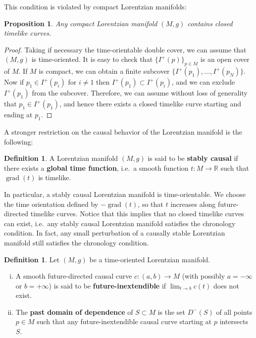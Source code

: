 \documentclass[12pt]{amsart}
\newcommand{\bbR}{\mathbb{R}}      %
\newcommand{\grad}{\operatorname{grad}}
\newtheorem{Prop}[Thm]{Proposition}
\theoremstyle{definition}
\newtheorem{Def}[Thm]{Definition}
\theoremstyle{remark}
\begin{document}
This condition is violated by compact Lorentzian manifolds:

\begin{Prop}
Any compact Lorentzian manifold $(M,g)$ contains closed timelike curves.
\end{Prop}

\begin{proof}
Taking if necessary the time-orientable double cover, we can assume that $(M,g)$ is time-oriented. It is easy to check that $\{ I^+(p) \}_{p \in M}$ is an open cover of $M$. If $M$ is compact, we can obtain a finite subcover $\{ I^+(p_1), \ldots, I^+(p_N) \}$. Now if $p_1 \in I^+(p_i)$ for $i \neq 1$ then $I^+(p_1) \subset I^+(p_i)$, and we can exclude $I^+(p_1)$ from the subcover. Therefore, we can assume without loss of generality that $p_1 \in I^+(p_1)$, and hence there exists a closed timelike curve starting and ending at $p_1$.
\end{proof}

A stronger restriction on the causal behavior of the Lorentzian manifold is the following:

\begin{Def}
A Lorentzian manifold $(M,g)$ is said to be {\bf stably causal} if there exists a {\bf global time function}, i.e.~a smooth function $t:M \to \bbR$ such that $\grad(t)$ is timelike.
\end{Def}

In particular, a stably causal Lorentzian manifold is time-orientable. We choose the time orientation defined by $-\grad(t)$, so that $t$ increases along future-directed timelike curves. Notice that this implies that no closed timelike curves can exist, i.e.~any stably causal Lorentzian manifold satisfies the chronology condition. In fact, any small perturbation of a causally stable Lorentzian manifold still satisfies the chronology condition.

\begin{Def}
Let $(M,g)$ be a time-oriented Lorentzian manifold. 
\begin{enumerate}[(i)]
\item
A smooth future-directed causal curve $c:(a,b) \to M$ (with possibly $a=-\infty$ or $b=+\infty$) is said to be {\bf future-inextendible} if $\lim_{t \to b} c(t)$ does not exist.
\item
The {\bf past domain of dependence} of $S\subset M$ is the set $D^-(S)$ of all points $p \in M$ such that any future-inextendible causal curve starting at $p$ intersects $S$.
\end{enumerate}
\end{Def}
\end{document}
